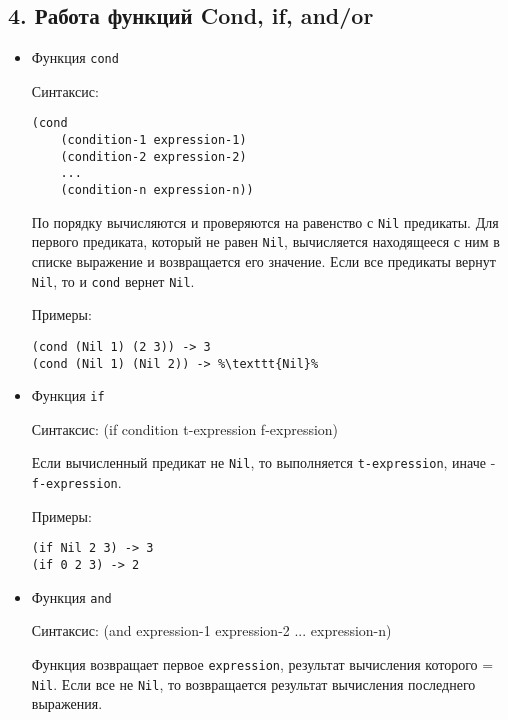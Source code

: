 \subsection*{4. Работа функций Cond, if, and/or}
\begin {itemize}
\item Функция \texttt{cond}

\hspace{1cm} Синтаксис:
\begin{lstlisting}
(cond 
	(condition-1 expression-1)
	(condition-2 expression-2)
	...
	(condition-n expression-n))
\end{lstlisting}

\hspace{1cm}По порядку вычисляются и проверяются на равенство с \texttt{Nil} предикаты. Для первого предиката, который не равен \texttt{Nil}, вычисляется находящееся с ним в списке выражение и возвращается его значение. Если все предикаты вернут \texttt{Nil}, то и \texttt{cond} вернет \texttt{Nil}.

\hspace{1cm} Примеры:
\begin{lstlisting}
(cond (Nil 1) (2 3)) -> 3
(cond (Nil 1) (Nil 2)) -> %\texttt{Nil}%
\end{lstlisting}

\item Функция \texttt{if}

\hspace{1cm} Синтаксис: (if condition t-expression f-expression)

\hspace{1cm} Если вычисленный предикат не \texttt{Nil}, то выполняется \texttt{t-expression}, иначе - \texttt{f-expression}.

\hspace{1cm} Примеры:

\begin{lstlisting}
(if Nil 2 3) -> 3
(if 0 2 3) -> 2
\end{lstlisting}

\item Функция \texttt{and}

\hspace{1cm} Синтаксис: (and expression-1 expression-2 ... expression-n)

\hspace{1cm}Функция возвращает первое \texttt{expression}, результат вычисления которого = \texttt{Nil}. Если все не \texttt{Nil}, то возвращается результат вычисления последнего выражения.


\end{itemize}
